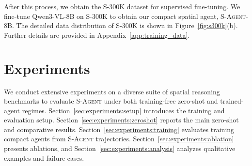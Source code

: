 \documentclass{llmxive}
\begin{document}
After this process, we obtain the \textsc{S-300K} dataset for supervised fine-tuning. 
We fine-tune Qwen3-VL-8B on \textsc{S-300K} to obtain our compact spatial agent, \textsc{S-Agent-8B}. 
The detailed data distribution of \textsc{S-300K} is shown in Figure~\ref{fig:s300k}(b).
Further details are provided in Appendix~\ref{app:training_data}.








\section{Experiments}
\label{sec:experiments}
We conduct extensive experiments on a diverse suite of spatial reasoning benchmarks to evaluate \textsc{S-Agent} under both training-free zero-shot and trained-agent regimes. 
Section~\ref{sec:experiments:setup} introduces the training and evaluation setup. 
Section~\ref{sec:experiments:zeroshot} reports the main zero-shot and comparative results. 
Section~\ref{sec:experiments:training} evaluates training compact agents from \textsc{S-Agent} trajectories. 
Section~\ref{sec:experiments:ablation} presents ablations, and Section~\ref{sec:experiments:analysis} analyzes qualitative examples and failure cases.
\end{document}
